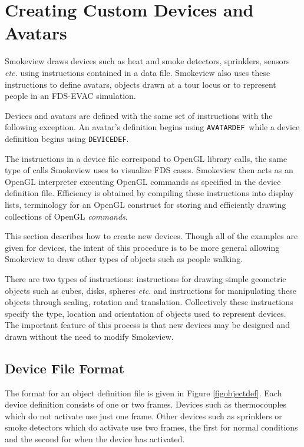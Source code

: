 \documentclass[11pt,twoside]{book}
\begin{document}
\chapter{Creating Custom Devices and Avatars}
Smokeview draws devices such as heat and smoke detectors,
sprinklers, sensors {\em etc.} using instructions contained in a
data file.  Smokeview also uses these instructions to define avatars, objects drawn
at a tour locus or to represent people in an FDS-EVAC simulation.

Devices and avatars are defined with the same set of instructions with the following exception.
An avatar's definition begins using {\tt AVATARDEF}\ while a device definition
begins using {\tt DEVICEDEF}.

The instructions in a device file correspond to OpenGL library calls,
the same type of calls Smokeview uses to visualize FDS cases.
Smokeview then acts as an OpenGL interpreter executing OpenGL
commands as specified in the device definition file. Efficiency is
obtained by compiling these instructions into display lists,
terminology for an OpenGL construct for storing and efficiently
drawing collections of OpenGL {\em commands}.

This section describes how to create new devices. Though all of
the examples are given for devices, the intent of this procedure
is to be more general allowing Smokeview to draw other types of
objects such as people walking.

There are two types of instructions: instructions for drawing
simple geometric objects such as cubes, disks, spheres {\em etc.}
and instructions for manipulating these objects through scaling,
rotation and translation. Collectively these instructions specify
the type, location and orientation of objects used to represent
devices.  The important feature of this process is that new
devices may be designed and drawn without the need to modify
Smokeview.

\section{Device File Format}
The format for an object definition file is given in Figure
\ref{figobjectdef}.  Each device definition consists of one or two
frames.  Devices such as thermocouples which do not activate use
just one frame. Other devices such as sprinklers or smoke
detectors which do activate use two frames, the first for normal
conditions and the second for when the device has activated.
\end{document}
